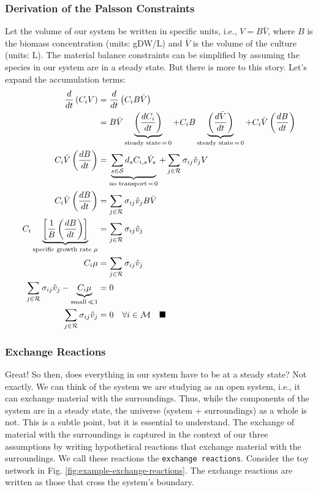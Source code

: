 \documentclass{article}[11pt]
\begin{document}
\subsubsection*{Derivation of the Palsson Constraints}
Let the volume of our system be written in specific units, i.e., $V=B\bar{V}$, where $B$ is the biomass concentration (units: gDW/L) and $\bar{V}$ is the volume of the culture (units: L). 
The material balance constraints can be simplified by assuming the species in our system are in a steady state. 
But there is more to this story. Let's expand the accumulation terms:
\begin{align*}
\frac{d}{dt}\left(C_{i}V\right) &= \frac{d}{dt}\left(C_{i}B\bar{V}\right)\\
&= B\bar{V}\underbrace{\left(\frac{dC_{i}}{dt}\right)}_{\text{steady state}\,=\,0} + C_{i}B\underbrace{\left(\frac{d\bar{V}}{dt}\right)}_{\text{steady state\,=\,0}} + C_{i}\bar{V}\left(\frac{dB}{dt}\right)\\
C_{i}\bar{V}\left(\frac{dB}{dt}\right) & = \underbrace{\sum_{s\in\mathcal{S}}d_{s}C_{i,s}\dot{V}_{s}}_{\text{no transport\,=\,0}} + \sum_{j\in\mathcal{R}}\sigma_{ij}\hat{v}_{j}V\\
C_{i}\bar{V}\left(\frac{dB}{dt}\right) & = \sum_{j\in\mathcal{R}}\sigma_{ij}\hat{v}_{j}B\bar{V}\\
C_{i}\underbrace{\left[\frac{1}{B}\left(\frac{dB}{dt}\right)\right]}_{\text{specific growth rate $\mu$}} & = \sum_{j\in\mathcal{R}}\sigma_{ij}\hat{v}_{j}\\
C_{i}\mu & = \sum_{j\in\mathcal{R}}\sigma_{ij}\hat{v}_{j}\\
\sum_{j\in\mathcal{R}}\sigma_{ij}\hat{v}_{j} - \underbrace{C_{i}\mu}_{\text{small}\,\ll{1}} & = 0\\
\sum_{j\in\mathcal{R}}\sigma_{ij}\hat{v}_{j} & = 0\quad\forall{i\in\mathcal{M}}\quad\blacksquare
\end{align*}


\subsubsection*{Exchange Reactions}
Great! So then, does everything in our system have to be at a steady state? Not exactly. 
We can think of the system we are studying as an open system, i.e., it can exchange material with the 
surroundings. Thus, while the components of the system are in a steady state, the universe (system + surroundings) 
as a whole is not. This is a subtle point, but it is essential to understand. The exchange of material with the
surroundings is captured in the context of our three assumptions by writing hypothetical reactions that 
exchange material with the surroundings. We call these reactions the \texttt{exchange reactions}.
Consider the toy network in Fig. \ref{fig:example-exchange-reactions}.
The exchange reactions are written as those that cross the system's boundary.
\end{document}
